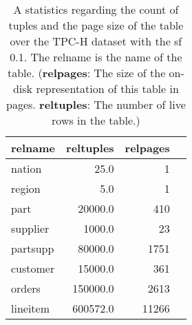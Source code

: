\begin{table*}[h!]
\centering
\caption[Table statistics sample with the \acrshort{sf} 0.1]{A statistics regarding the count of tuples and the page size of the table over the TPC-H dataset with the \acrshort{sf} 0.1. The relname is the
name of the table. (\textbf{relpages}: The size of the on-disk representation of
this table in pages. \textbf{reltuples}: The number of live rows in the table.)}
\begin{tabular}{lrrr}
    \toprule   
  \textbf{relname}&\textbf{reltuples}&\textbf{relpages}\\
    \midrule
nation      & 25.0      & 1     \\
region      & 5.0       & 1     \\
part        & 20000.0   & 410   \\
supplier    & 1000.0    & 23    \\
partsupp    & 80000.0   & 1751  \\
customer    & 15000.0   & 361   \\
orders      & 150000.0  & 2613  \\
lineitem    & 600572.0  & 11266 \\
      \bottomrule
\end{tabular}
 \label{tab:statistics-eval}
\end{table*}